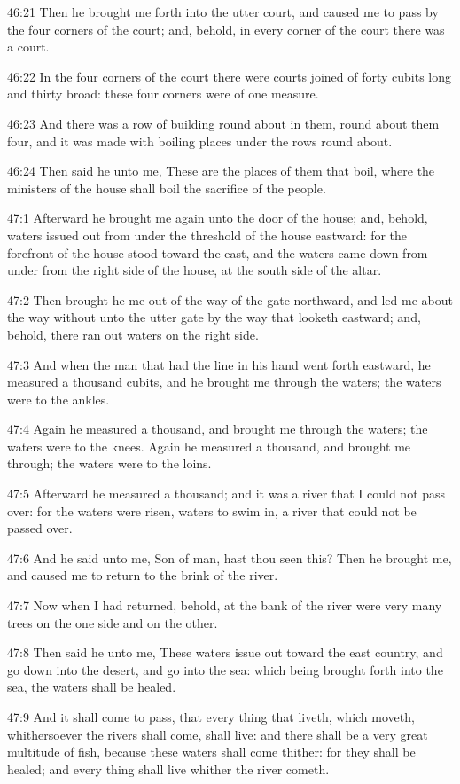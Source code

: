 46:21 Then he brought me forth into the utter court, and caused me to
pass by the four corners of the court; and, behold, in every corner of
the court there was a court.

46:22 In the four corners of the court there were courts joined of
forty cubits long and thirty broad: these four corners were of one
measure.

46:23 And there was a row of building round about in them, round about
them four, and it was made with boiling places under the rows round
about.

46:24 Then said he unto me, These are the places of them that boil,
where the ministers of the house shall boil the sacrifice of the
people.

47:1 Afterward he brought me again unto the door of the house; and,
behold, waters issued out from under the threshold of the house
eastward: for the forefront of the house stood toward the east, and
the waters came down from under from the right side of the house, at
the south side of the altar.

47:2 Then brought he me out of the way of the gate northward, and led
me about the way without unto the utter gate by the way that looketh
eastward; and, behold, there ran out waters on the right side.

47:3 And when the man that had the line in his hand went forth
eastward, he measured a thousand cubits, and he brought me through the
waters; the waters were to the ankles.

47:4 Again he measured a thousand, and brought me through the waters;
the waters were to the knees. Again he measured a thousand, and
brought me through; the waters were to the loins.

47:5 Afterward he measured a thousand; and it was a river that I could
not pass over: for the waters were risen, waters to swim in, a river
that could not be passed over.

47:6 And he said unto me, Son of man, hast thou seen this? Then he
brought me, and caused me to return to the brink of the river.

47:7 Now when I had returned, behold, at the bank of the river were
very many trees on the one side and on the other.

47:8 Then said he unto me, These waters issue out toward the east
country, and go down into the desert, and go into the sea: which being
brought forth into the sea, the waters shall be healed.

47:9 And it shall come to pass, that every thing that liveth, which
moveth, whithersoever the rivers shall come, shall live: and there
shall be a very great multitude of fish, because these waters shall
come thither: for they shall be healed; and every thing shall live
whither the river cometh.

